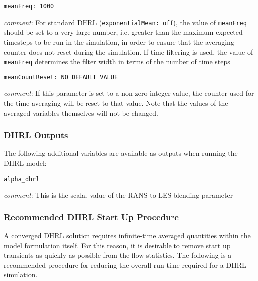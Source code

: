 \begin{verbatim}
meanFreq: 1000
\end{verbatim}

{\it comment}: For standard DHRL ({\tt exponentialMean: off}), the value of
{\tt meanFreq} should be set to a very large number, i.e. greater than the
maximum expected timesteps to be run in the simulation, in order to
ensure that the averaging counter does not reset during the
simulation. If time filtering is used, the value of {\tt meanFreq}
determines the filter width in terms of the number of time steps

\begin{verbatim}
meanCountReset: NO DEFAULT VALUE
\end{verbatim}

{\it comment}: If this parameter is set to a non-zero integer value,
the counter used for the time averaging will be reset to that
value. Note that the values of the averaged variables themselves will
not be changed.


\subsubsection{DHRL Outputs}

The following additional variables are available as outputs when running the DHRL model:

\begin{verbatim}
alpha_dhrl
\end{verbatim}

{\it comment}: This is the scalar value of the RANS-to-LES blending parameter


\subsubsection{Recommended DHRL Start Up Procedure}

A converged DHRL solution requires infinite-time averaged quantities
within the model formulation itself. For this reason, it is desirable
to remove start up transients as quickly as possible from the flow
statistics. The following is a recommended procedure for reducing the
overall run time required for a DHRL simulation.


